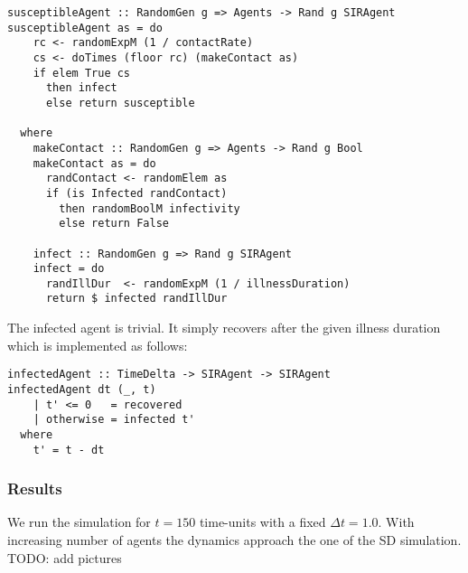 \begin{verbatim}
susceptibleAgent :: RandomGen g => Agents -> Rand g SIRAgent
susceptibleAgent as = do
    rc <- randomExpM (1 / contactRate)
    cs <- doTimes (floor rc) (makeContact as)
    if elem True cs
      then infect
      else return susceptible

  where
    makeContact :: RandomGen g => Agents -> Rand g Bool
    makeContact as = do
      randContact <- randomElem as
      if (is Infected randContact)
        then randomBoolM infectivity
        else return False

    infect :: RandomGen g => Rand g SIRAgent
    infect = do
      randIllDur  <- randomExpM (1 / illnessDuration)
      return $ infected randIllDur
\end{verbatim}

The infected agent is trivial. It simply recovers after the given illness duration which is implemented as follows:

\begin{verbatim}
infectedAgent :: TimeDelta -> SIRAgent -> SIRAgent
infectedAgent dt (_, t) 
    | t' <= 0   = recovered
    | otherwise = infected t'
  where
    t' = t - dt  
\end{verbatim}

\subsubsection{Results}
We run the simulation for $t = 150$ time-units with a fixed $\Delta t = 1.0$. With increasing number of agents the dynamics approach the one of the SD simulation. TODO: add pictures

